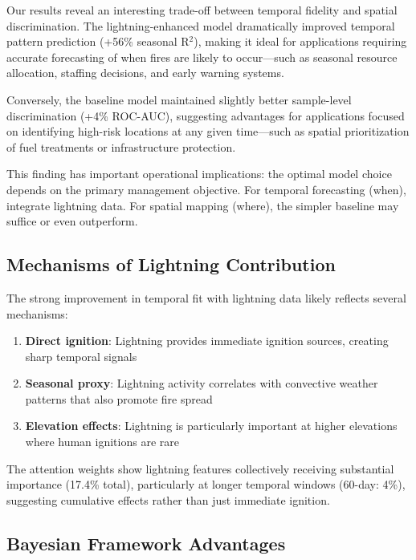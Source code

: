 \documentclass[11pt,a4paper]{article}
\begin{document}
Our results reveal an interesting trade-off between temporal fidelity and spatial discrimination. The lightning-enhanced model dramatically improved temporal pattern prediction (+56\% seasonal R$^2$), making it ideal for applications requiring accurate forecasting of when fires are likely to occur---such as seasonal resource allocation, staffing decisions, and early warning systems.

Conversely, the baseline model maintained slightly better sample-level discrimination (+4\% ROC-AUC), suggesting advantages for applications focused on identifying high-risk locations at any given time---such as spatial prioritization of fuel treatments or infrastructure protection.

This finding has important operational implications: the optimal model choice depends on the primary management objective. For temporal forecasting (when), integrate lightning data. For spatial mapping (where), the simpler baseline may suffice or even outperform.

\subsection{Mechanisms of Lightning Contribution}

The strong improvement in temporal fit with lightning data likely reflects several mechanisms:

\begin{enumerate}
    \item \textbf{Direct ignition}: Lightning provides immediate ignition sources, creating sharp temporal signals
    \item \textbf{Seasonal proxy}: Lightning activity correlates with convective weather patterns that also promote fire spread
    \item \textbf{Elevation effects}: Lightning is particularly important at higher elevations where human ignitions are rare
\end{enumerate}

The attention weights show lightning features collectively receiving substantial importance (17.4\% total), particularly at longer temporal windows (60-day: 4\%), suggesting cumulative effects rather than just immediate ignition.

\subsection{Bayesian Framework Advantages}
\end{document}
